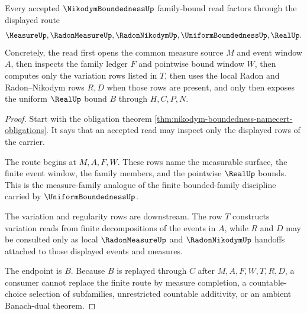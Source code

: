\begin{theorem}
\label{thm:nikodym-boundedness-measure-family-route}
Every accepted $\NikodymBoundednessUp$ family-bound read factors through the displayed route
$$
\MeasureUp,\RadonMeasureUp,\RadonNikodymUp,\UniformBoundednessUp,\RealUp .
$$
Concretely, the read first opens the common measure source $M$ and event window $A$, then inspects the family ledger $F$ and pointwise bound window $W$, then computes only the variation rows listed in $T$, then uses the local Radon and Radon--Nikodym rows $R,D$ when those rows are present, and only then exposes the uniform $\RealUp$ bound $B$ through $H,C,P,N$.
\end{theorem}
\begin{proof}
Start with the obligation theorem \autoref{thm:nikodym-boundedness-namecert-obligations}. It says that an accepted read may inspect only the displayed rows of the carrier.

The route begins at $M,A,F,W$. These rows name the measurable surface, the finite event window, the family members, and the pointwise $\RealUp$ bounds. This is the measure-family analogue of the finite bounded-family discipline carried by $\UniformBoundednessUp$.

The variation and regularity rows are downstream. The row $T$ constructs variation reads from finite decompositions of the events in $A$, while $R$ and $D$ may be consulted only as local $\RadonMeasureUp$ and $\RadonNikodymUp$ handoffs attached to those displayed events and measures.

The endpoint is $B$. Because $B$ is replayed through $C$ after $M,A,F,W,T,R,D$, a consumer cannot replace the finite route by measure completion, a countable-choice selection of subfamilies, unrestricted countable additivity, or an ambient Banach-dual theorem.
\end{proof}


